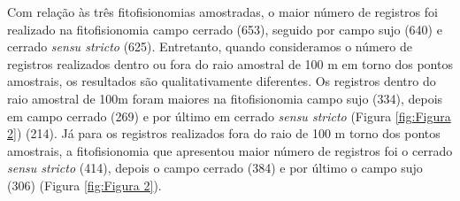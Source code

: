 Com relação às três fitofisionomias amostradas, o maior número de registros foi realizado na fitofisionomia campo cerrado (653), seguido por campo sujo (640) e cerrado \textit{sensu stricto} (625). Entretanto, quando consideramos o número de registros realizados dentro ou fora do raio amostral de 100 m em torno dos pontos amostrais, os resultados são qualitativamente diferentes.
Os registros dentro do raio amostral de 100m foram maiores na fitofisionomia campo sujo (334), depois em campo cerrado (269) e por último em cerrado \textit{sensu stricto} (Figura \ref{fig:Figura 2}) (214). Já para os registros realizados fora do raio de 100 m torno dos pontos amostrais, a fitofisionomia que apresentou maior número de registros foi o cerrado \textit{sensu stricto} (414), depois o campo cerrado (384) e por último o campo sujo (306) (Figura \ref{fig:Figura 2}).
